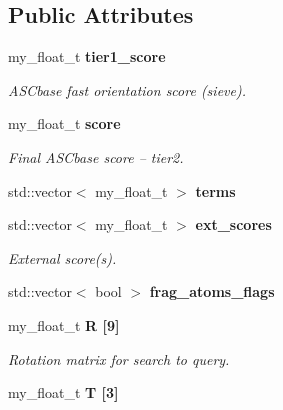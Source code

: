 \subsection*{Public Attributes}
\begin{CompactItemize}
\item 
my\_\-float\_\-t \bf{tier1\_\-score}\label{classASCbase_1_1rigid__align__t_1fef21d1eb205408a96f533891e79557}

\begin{CompactList}\small\item\em ASCbase fast orientation score (sieve). \item\end{CompactList}\item 
my\_\-float\_\-t \bf{score}\label{classASCbase_1_1rigid__align__t_90a54e487c78c50e21dcb7f781cc37ef}

\begin{CompactList}\small\item\em Final ASCbase score -- tier2. \item\end{CompactList}\item 
std::vector$<$ my\_\-float\_\-t $>$ \textbf{terms}\label{classASCbase_1_1rigid__align__t_6cf98bc92eac939ebe592ae47a49446a}

\item 
std::vector$<$ my\_\-float\_\-t $>$ \bf{ext\_\-scores}\label{classASCbase_1_1rigid__align__t_0ce6360ea3d61818cd088f34f2cf118d}

\begin{CompactList}\small\item\em External score(s). \item\end{CompactList}\item 
std::vector$<$ bool $>$ \textbf{frag\_\-atoms\_\-flags}\label{classASCbase_1_1rigid__align__t_8a3efbcef870f53faa51a54e64918e17}

\item 
my\_\-float\_\-t \bf{R} [9]\label{classASCbase_1_1rigid__align__t_c19150913ee8369262f89abf3dba1839}

\begin{CompactList}\small\item\em Rotation matrix for search to query. \item\end{CompactList}\item 
my\_\-float\_\-t \bf{T} [3]\label{classASCbase_1_1rigid__align__t_c66d5098258a0e0296c47b3d438dfd40}


\end{CompactItemize}

